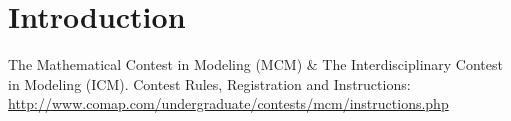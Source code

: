 \section{Introduction}\label{sec:introduction}
The Mathematical Contest in Modeling (MCM) \& The Interdisciplinary Contest in Modeling (ICM). Contest Rules, Registration and Instructions: \url{http://www.comap.com/undergraduate/contests/mcm/instructions.php}
